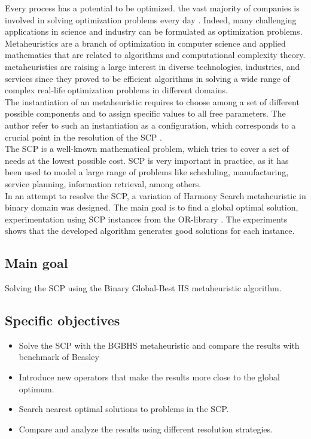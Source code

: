 Every process has a potential to be optimized. the vast majority of companies is involved in solving optimization problems every day \cite{DBLP:books/daglib/0022645}. Indeed, many challenging applications in science and industry can be formulated as optimization problems.\\

Metaheuristics are a branch of optimization in computer science and applied mathematics that are related to algorithms and computational complexity theory. metaheuristics are raising a large interest in diverse technologies, industries, and services since they proved to be efficient algorithms in solving a wide range of  complex real-life optimization problems in different domains.\\

The instantiation of an metaheuristic requires to choose among a set of different possible components and to assign specific values to all free parameters. The author refer to such an instantiation as a configuration, which corresponds to a crucial point in the resolution of the SCP \cite{DBLP:conf/gecco/BirattariSPV02}.\\

The SCP is a well-known mathematical problem, which tries to cover a set of needs at the lowest possible cost. SCP is very important in practice, as it has been used to model a large range of problems like scheduling, manufacturing, service planning, information retrieval, among others.\\

In an attempt to resolve the SCP, a variation of Harmony Search metaheuristic in binary domain  was designed. The main goal is to find a global optimal solution, experimentation using SCP instances from the OR-library \cite{citeulike:921349}. The experiments shows that the developed algorithm generates good solutions for each instance.

\subsection{Main goal}
Solving the SCP using the Binary Global-Best HS metaheuristic algorithm. 

\subsection{Specific objectives}
\begin{itemize}
\item Solve the SCP with the BGBHS metaheuristic and compare the results with benchmark of Beasley	
\item Introduce new operators that make the results more close to the global optimum.
\item Search nearest optimal solutions to problems in the SCP.
\item Compare and analyze the results using different resolution strategies.
\end{itemize}


